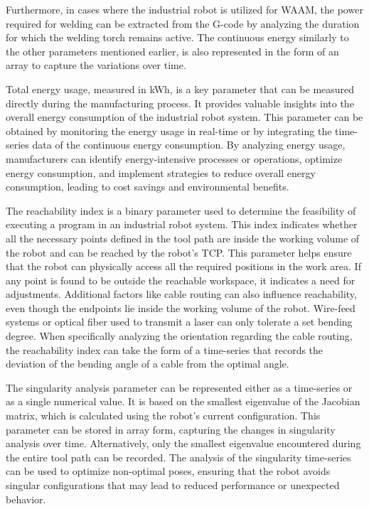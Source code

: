 Furthermore, in cases where the industrial robot is utilized for WAAM, the power required for welding can be extracted from the G-code by analyzing the duration for which the welding torch remains active. The continuous energy similarly to the other parameters mentioned earlier, is also represented in the form of an array to capture the variations over time.

Total energy usage, measured in kWh, is a key parameter that can be measured directly during the manufacturing process. It provides valuable insights into the overall energy consumption of the industrial robot system. This parameter can be obtained by monitoring the energy usage in real-time or by integrating the time-series data of the continuous energy consumption. By analyzing energy usage, manufacturers can identify energy-intensive processes or operations, optimize energy consumption, and implement strategies to reduce overall energy consumption, leading to cost savings and environmental benefits.



The reachability index is a binary parameter used to determine the feasibility of executing a program in an industrial robot system. This index indicates whether all the necessary points defined in the tool path are inside the working volume of the robot and can be reached by the robot's TCP. This parameter helps ensure that the robot can physically access all the required positions in the work area. If any point is found to be outside the reachable workspace, it indicates a need for adjustments. Additional factors like cable routing can also influence reachability, even though the endpoints lie inside the working volume of the robot. Wire-feed systems or optical fiber used to transmit a laser can only tolerate a set bending degree. When specifically analyzing the orientation regarding the cable routing, the reachability index can take the form of a time-series that records the deviation of the bending angle of a cable from the optimal angle.


The singularity analysis parameter can be represented either as a time-series or as a single numerical value. It is based on the smallest eigenvalue of the Jacobian matrix, which is calculated using the robot's current configuration. This parameter can be stored in array form, capturing the changes in singularity analysis over time. Alternatively, only the smallest eigenvalue encountered during the entire tool path can be recorded. The analysis of the singularity time-series can be used to optimize non-optimal poses, ensuring that the robot avoids singular configurations that may lead to reduced performance or unexpected behavior.

